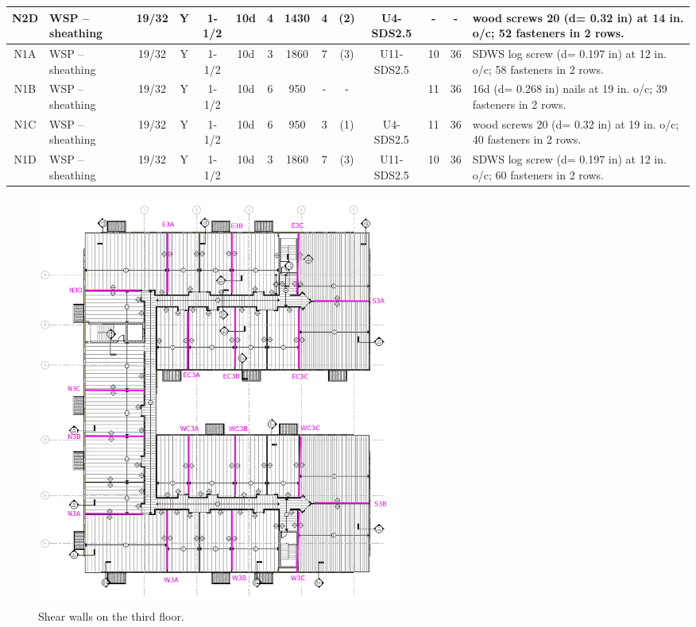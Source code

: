 \begin{center}
\begin{tiny}
\begin{longtable}{|c|p{1.25cm}|c|c|c|c|c|c|c|c|c|c|c|p{2cm}|}
\hline
N2D & WSP – sheathing & 19/32 & Y & 1-1/2 & 10d & 4 & 1430 & 4 & (2) & U4-SDS2.5 & - & - & wood screws 20 (d= 0.32 in) at 14 in. o/c; 52 fasteners in 2 rows.\\
\hline
N1A & WSP – sheathing & 19/32 & Y & 1-1/2 & 10d & 3 & 1860 & 7 & (3) & U11-SDS2.5 & 10 & 36 & SDWS log screw (d= 0.197 in) at 12 in. o/c; 58 fasteners in 2 rows.\\
\hline
N1B & WSP – sheathing & 19/32 & Y & 1-1/2 & 10d & 6 & 950 & - & - &  & 11 & 36 & 16d (d= 0.268 in) nails at 19 in. o/c; 39 fasteners in 2 rows.\\
\hline
N1C & WSP – sheathing & 19/32 & Y & 1-1/2 & 10d & 6 & 950 & 3 & (1) & U4-SDS2.5 & 11 & 36 & wood screws 20 (d= 0.32 in) at 19 in. o/c; 40 fasteners in 2 rows.\\
\hline
N1D & WSP – sheathing & 19/32 & Y & 1-1/2 & 10d & 3 & 1860 & 7 & (3) & U11-SDS2.5 & 10 & 36 & SDWS log screw (d= 0.197 in) at 12 in. o/c; 60 fasteners in 2 rows.\\
\hline
  \end{longtable}
  \end{tiny}
  \end{center}

\begin{figure}
  \begin{center}
  \includegraphics[width=120mm]{figures/3rd_floor_key_plan}
  \end{center}
  \caption{Shear walls on the third floor.}\label{fg_3rd_floor_key_plan}
\end{figure}

